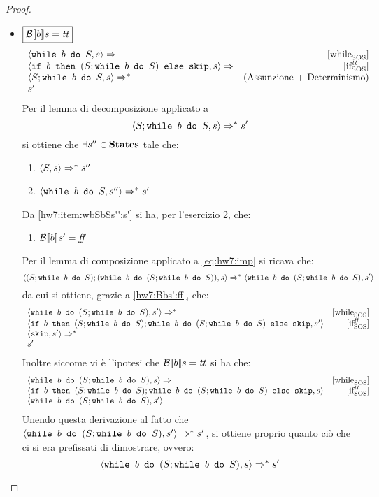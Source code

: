 {\begin{proof}
\begin{itemize}
	\item $\boxed{\B{b} = \semtrue}$
	$$
	\begin{array}{lr}
	\confSs{\wbS{b}{S}}{s} \Rar{ }  & \whileSOS \\
	\confSs{\ifABC{b}{(S;\wbS{b}{S})}{\skipForFriends}}{s} \Rar{ } & \ifttSOS\\
	\confSs{S; \wbS{b}{S}}{s} \Rar{*} & (\text{Assunzione + Determinismo})\\
	s'
	\end{array}
	$$
	Per il lemma di decomposizione applicato a
	\begin{equation}
	\confSs{S; \wbS{b}{S}}{s} \Rar{*} s'
		\label{eq:hw7:imp}
	\end{equation}
	si ottiene che $\exists s'' \in \states$ tale che: 
	\begin{enumerate}[label=(\alph*)]
		\item $\confSs{S}{s} \Rar{*} s''$
		\item $\confSs{\wbS{b}{S}}{s''} \Rar{*} s'$
		\label{hw7:item:wbSbSs'':s'}
	\end{enumerate}
	Da \ref{hw7:item:wbSbSs'':s'} si ha, per l'esercizio 2, che:
	\begin{enumerate}[label=(\Roman*)]
		\item $\B{b}' = \semfalse$
		\label{hw7:Bbs':ff}
	\end{enumerate}  
	Per il lemma di composizione applicato a \ref{eq:hw7:imp} si ricava che:
	$$
	\confSs{(S; \wbS{b}{S}); (\wbS{b}{(S; \wbS{b}{S})})}{s} \Rar{*} \confSs{\wbS{b}{(S; \wbS{b}{S})}}{s'} 
	$$
	da cui si ottiene, grazie a \ref{hw7:Bbs':ff}, che:
	$$
	\begin{array}{lr}
	\confSs{\wbS{b}{(S; \wbS{b}{S})}}{s'} \Rar{*} & \whileSOS\\
	\confSs{\ifABC{b}{(S; \wbS{b}{S}); \wbS{b}{(S; \wbS{b}{S})}}{\skipForFriends}}{s'} & \ifffSOS\\
	\confSs{\skipForFriends}{s'} \Rar{*} & \\
	s' & \\
	\label{hw:arary}
	\end{array}
	$$  
	Inoltre siccome vi è l'ipotesi che $\B{b} = \semtrue$ si ha che:
	$$
	\begin{array}{lr}
	\confSs{\wbS{b}{(S; \wbS{b}{S})}}{s} \Rar{ } & \whileSOS\\
	\confSs{\ifABC{b}{(S; \wbS{b}{S}); \wbS{b}{(S; \wbS{b}{S})}}{\skipForFriends}}{s} & \ifttSOS \\
	\confSs{\wbS{b}{(S; \wbS{b}{S})}}{s'} & 
	\end{array}
	$$
	Unendo questa derivazione al fatto che
	$\confSs{\wbS{b}{(S; \wbS{b}{S})}}{s'} \Rar{*} s'$, si ottiene
	proprio quanto ciò che ci si era prefissati di dimostrare, ovvero:
	$$
	\confSs{\wbS{b}{(S; \wbS{b}{S})}}{s} \Rar{*} s'
	$$
\end{itemize}


\end{proof}}
